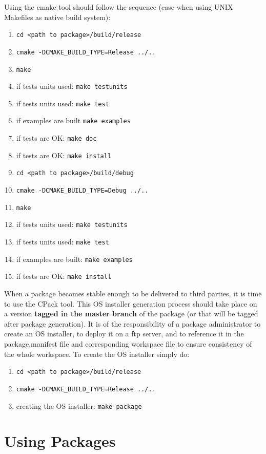 \documentclass[12pt,a4paper]{article}
\begin{document}
Using the cmake tool should follow the sequence (case when using UNIX Makefiles as native build system):
\begin{enumerate}
\item \verb|cd <path to package>/build/release|
\item \verb|cmake -DCMAKE_BUILD_TYPE=Release ../..|
\item \verb|make|
\item if tests units used: \verb|make testunits|
\item if tests units used: \verb|make test|
\item if examples are built \verb|make examples|
\item if tests are OK: \verb|make doc|
\item if tests are OK: \verb|make install|
\item \verb|cd <path to package>/build/debug|
\item \verb|cmake -DCMAKE_BUILD_TYPE=Debug ../..|
\item \verb|make|
\item if tests units used: \verb|make testunits|
\item if tests units used: \verb|make test|
\item if examples are built: \verb|make examples|
\item if tests are OK: \verb|make install|
\end{enumerate}

When a package becomes stable enough to be delivered to third parties, it is time to use the CPack tool. This OS installer generation process should take place on a version \textbf{tagged in the master branch} of the package (or that will be tagged after package generation). It is of the responsibility of a package administrator to create an OS installer, to deploy it on a ftp server, and to reference it in the package.manifest file and corresponding workspace file to ensure consistency of the whole workspace. To create the OS installer simply do:
\begin{enumerate}
\item \verb|cd <path to package>/build/release|
\item \verb|cmake -DCMAKE_BUILD_TYPE=Release ../..|
\item creating the OS installer: \verb|make package|
\end{enumerate}


\section{Using Packages}
\end{document}
